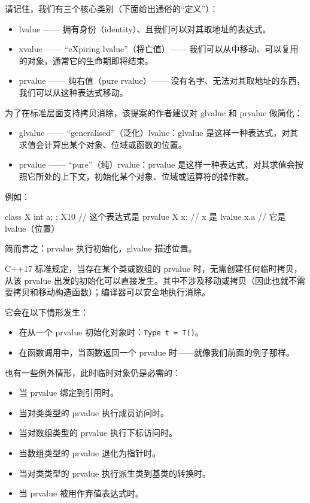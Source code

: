 请记住，我们有三个核心类别（下面给出通俗的“定义”）：

\begin{itemize}
\item lvalue —— 拥有身份（identity）、且我们可以对其取地址的表达式。
\item xvalue —— “eXpiring lvalue”（将亡值）—— 我们可以从中移动、可以复用的对象，通常它的生命期即将结束。
\item prvalue —— 纯右值（pure rvalue）—— 没有名字、无法对其取地址的东西，我们可以从这种表达式移动。
\end{itemize}

为了在标准层面支持拷贝消除，该提案的作者建议对 glvalue 和 prvalue 做简化：

\begin{itemize}
\item glvalue —— “generalised”（泛化）lvalue：glvalue 是这样一种表达式，对其求值会计算出某个对象、位域或函数的位置。
\item prvalue —— “pure”（纯）rvalue：prvalue 是这样一种表达式，对其求值会按照它所处的上下文，初始化某个对象、位域或运算符的操作数。
\end{itemize}

例如：

\begin{codebox}[cpp]
class X { int a; };
X{10}
// 这个表达式是 prvalue
X x;
// x 是 lvalue
x.a
// 它是 lvalue（位置）
\end{codebox}

简而言之：prvalue 执行初始化，glvalue 描述位置。

C++17 标准规定，当存在某个类或数组的 prvalue 时，无需创建任何临时拷贝，从该 prvalue 出发的初始化可以直接发生。其中不涉及移动或拷贝（因此也就不需要拷贝和移动构造函数）；编译器可以安全地执行消除。

它会在以下情形发生：

\begin{itemize}
\item 在从一个 prvalue 初始化对象时：\texttt{Type t = T()}。
\item 在函数调用中，当函数返回一个 prvalue 时——就像我们前面的例子那样。
\end{itemize}

也有一些例外情形，此时临时对象仍是必需的：

\begin{itemize}
\item 当 prvalue 绑定到引用时。
\item 当对类类型的 prvalue 执行成员访问时。
\item 当对数组类型的 prvalue 执行下标访问时。
\item 当数组类型的 prvalue 退化为指针时。
\item 当对类类型的 prvalue 执行派生类到基类的转换时。
\item 当 prvalue 被用作弃值表达式时。
\end{itemize}

